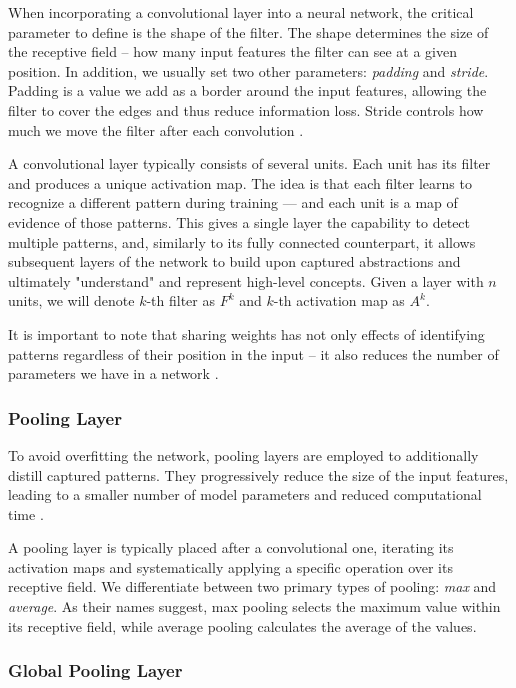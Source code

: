 When incorporating a convolutional layer into a neural network, the critical parameter to define is the shape of the filter.
The shape determines the size of the receptive field -- how many input features the filter can see at a given position.
In addition, we usually set two other parameters: \emph{padding} and \emph{stride}.
Padding is a value we add as a border around the input features, allowing the filter to cover the edges and thus reduce information loss.
Stride controls how much we move the filter after each convolution \cite{cnns}.

A convolutional layer typically consists of several units.
Each unit has its filter and produces a unique activation map.
The idea is that each filter learns to recognize a different pattern during training --- and each unit is a map of evidence of those patterns.
This gives a single layer the capability to detect multiple patterns, and, similarly to its fully connected counterpart, it allows subsequent layers of the network to build upon captured abstractions and ultimately "understand" and represent high-level concepts.
Given a layer with $n$ units, we will denote $k$-th filter as $F^k$ and $k$-th activation map as $A^k$.

It is important to note that sharing weights has not only effects of identifying patterns regardless of their position in the input -- it also reduces the number of parameters we have in a network \cite{cnns}.

\subsubsection{Pooling Layer}

To avoid overfitting the network, pooling layers are employed to additionally distill captured patterns.
They progressively reduce the size of the input features, leading to a smaller number of model parameters and reduced computational time \cite{cnns}.

A pooling layer is typically placed after a convolutional one, iterating its activation maps and systematically applying a specific operation over its receptive field.
We differentiate between two primary types of pooling: \emph{max} and \emph{average}.
As their names suggest, max pooling selects the maximum value within its receptive field, while average pooling calculates the average of the values.

\subsubsection{Global Pooling Layer}


